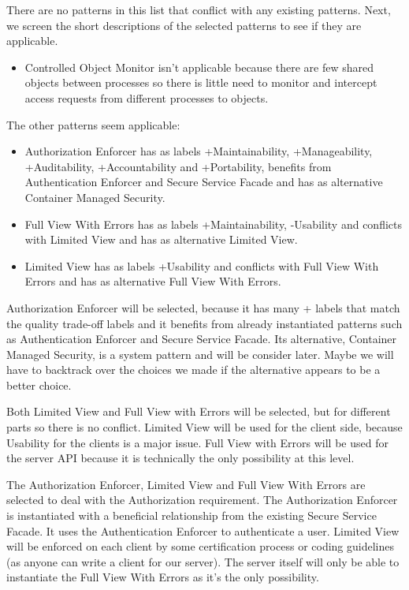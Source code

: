 \documentclass[a4paper,11pt]{report}
\begin{document}
There are no patterns in this list that conflict with any existing patterns.
Next, we screen the short descriptions of the selected patterns to see if they are applicable.
\begin{itemize}
\item Controlled Object Monitor isn't applicable because there are few shared objects between processes so
there is little need to monitor and intercept access requests from different processes to objects.
\end{itemize}
The other patterns seem applicable:
\begin{itemize}
\item Authorization Enforcer has as labels +Maintainability, +Manageability, +Auditability, +Accountability and
+Portability, benefits from Authentication Enforcer and Secure Service Facade and has as alternative
Container Managed Security.

\item Full View With Errors has as labels +Maintainability, -Usability and conflicts with Limited View and has as
alternative Limited View.

\item Limited View has as labels +Usability and conflicts with Full View With Errors and has as alternative Full View
With Errors.
\end{itemize}

Authorization Enforcer will be selected, because it has many + labels that match the quality trade-off labels and
it benefits from already instantiated patterns such as Authentication Enforcer and Secure Service Facade. Its
alternative, Container Managed Security, is a system pattern and will be consider later. Maybe we will have to
backtrack over the choices we made if the alternative appears to be a better choice.

Both Limited View and Full View with Errors will be selected, but for different parts so there is no conflict.
Limited View will be used for the client side, because Usability for the clients is a major issue. Full View with
Errors will be used for the server API because it is technically the only possibility at this level.

The Authorization Enforcer, Limited View and Full View With Errors are selected to deal with the Authorization requirement. The Authorization Enforcer is instantiated with a beneficial relationship from the existing Secure Service Facade. It uses the Authentication Enforcer to authenticate a user. Limited View will be enforced on each client by some certification process or coding guidelines (as anyone can write a client for our server). The server itself will only be able to instantiate the Full View With Errors as it's the only possibility.
\end{document}
